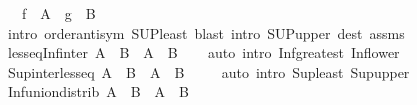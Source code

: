 \begin{isabellebody}
\ \ \ {\isachardoublequoteopen}{\isasymSqunion}{\isacharparenleft}{\kern0pt}f\ {\isacharbackquote}{\kern0pt}\ A{\isacharparenright}{\kern0pt}\ {\isacharequal}{\kern0pt}\ {\isasymSqunion}{\isacharparenleft}{\kern0pt}g\ {\isacharbackquote}{\kern0pt}\ B{\isacharparenright}{\kern0pt}{\isachardoublequoteclose}\isanewline
%
\isadelimproof
\ \ %
\endisadelimproof
%
\isatagproof
{}\isamarkupfalse%
\ {\isacharparenleft}{\kern0pt}intro\ order{\isachardot}{\kern0pt}antisym\ SUP{\isacharunderscore}{\kern0pt}least{\isacharparenright}{\kern0pt}\ {\isacharparenleft}{\kern0pt}blast\ intro{\isacharcolon}{\kern0pt}\ SUP{\isacharunderscore}{\kern0pt}upper{}\ dest{\isacharcolon}{\kern0pt}\ assms{\isacharparenright}{\kern0pt}{\isacharplus}{\kern0pt}%
\endisatagproof
{\isafoldproof}%
%
\isadelimproof
\isanewline
%
\endisadelimproof
\isanewline
{}\isamarkupfalse%
\ less{\isacharunderscore}{\kern0pt}eq{\isacharunderscore}{\kern0pt}Inf{\isacharunderscore}{\kern0pt}inter{\isacharcolon}{\kern0pt}\ {\isachardoublequoteopen}{\isasymSqinter}A\ {\isasymsqunion}\ {\isasymSqinter}B\ {\isasymle}\ {\isasymSqinter}{\isacharparenleft}{\kern0pt}A\ {\isasyminter}\ B{\isacharparenright}{\kern0pt}{\isachardoublequoteclose}\isanewline
%
\isadelimproof
\ \ %
\endisadelimproof
%
\isatagproof
{}\isamarkupfalse%
\ {\isacharparenleft}{\kern0pt}auto\ intro{\isacharcolon}{\kern0pt}\ Inf{\isacharunderscore}{\kern0pt}greatest\ Inf{\isacharunderscore}{\kern0pt}lower{\isacharparenright}{\kern0pt}%
\endisatagproof
{\isafoldproof}%
%
\isadelimproof
\isanewline
%
\endisadelimproof
\isanewline
{}\isamarkupfalse%
\ Sup{\isacharunderscore}{\kern0pt}inter{\isacharunderscore}{\kern0pt}less{\isacharunderscore}{\kern0pt}eq{\isacharcolon}{\kern0pt}\ {\isachardoublequoteopen}{\isasymSqunion}{\isacharparenleft}{\kern0pt}A\ {\isasyminter}\ B{\isacharparenright}{\kern0pt}\ {\isasymle}\ {\isasymSqunion}A\ {\isasymsqinter}\ {\isasymSqunion}B\ {\isachardoublequoteclose}\isanewline
%
\isadelimproof
\ \ %
\endisadelimproof
%
\isatagproof
{}\isamarkupfalse%
\ {\isacharparenleft}{\kern0pt}auto\ intro{\isacharcolon}{\kern0pt}\ Sup{\isacharunderscore}{\kern0pt}least\ Sup{\isacharunderscore}{\kern0pt}upper{\isacharparenright}{\kern0pt}%
\endisatagproof
{\isafoldproof}%
%
\isadelimproof
\isanewline
%
\endisadelimproof
\isanewline
{}\isamarkupfalse%
\ Inf{\isacharunderscore}{\kern0pt}union{\isacharunderscore}{\kern0pt}distrib{\isacharcolon}{\kern0pt}\ {\isachardoublequoteopen}{\isasymSqinter}{\isacharparenleft}{\kern0pt}A\ {\isasymunion}\ B{\isacharparenright}{\kern0pt}\ {\isacharequal}{\kern0pt}\ {\isasymSqinter}A\ {\isasymsqinter}\ {\isasymSqinter}B{\isachardoublequoteclose}\isanewline

\end{isabellebody}
